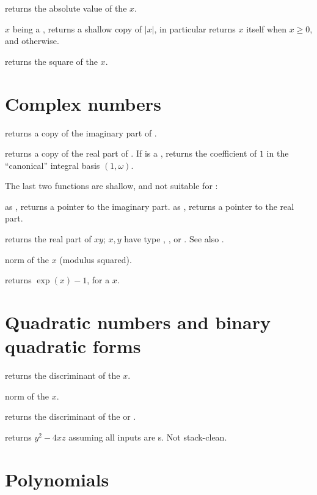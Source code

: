  returns the absolute value of the  $x$.

 $x$ being a , returns a shallow
copy of $|x|$, in particular returns $x$ itself when $x \geq 0$, and
 otherwise.

 returns the square of the  $x$.

\section{Complex numbers}

 returns a copy of the imaginary part of .

 returns a copy of the real part of . If 
is a , returns the coefficient of $1$ in the ``canonical'' integral
basis $(1,\omega)$.

The last two functions are shallow, and not suitable for :

 as , returns a pointer to the imaginary
part.
 as , returns a pointer to the real part.

 returns the real part of $xy$;
$x,y$ have type , ,  or . See also
.

 norm of the  $x$ (modulus squared).

 returns $\exp(x)-1$, for a  $x$.

\section{Quadratic numbers and binary quadratic forms}

 returns the discriminant of the  $x$.

 norm of the  $x$.

 returns the discriminant of the 
or  .

 returns $y^2 - 4xz$ assuming all
inputs are s. Not stack-clean.

\section{Polynomials}\label{se:polynomials}

